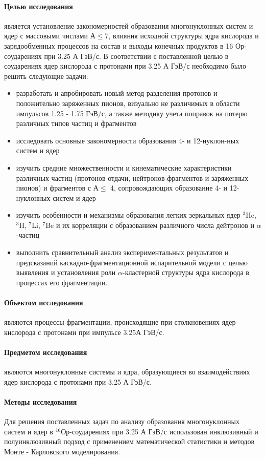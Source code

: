 \documentclass[fontsize=14pt]{scrarticle}
\begin{document}
\paragraph{Целью исследования}  является установление закономерностей образования многонуклонных систем и ядер с массовыми числами А$\le$7,
влияния исходной структуры ядра кислорода и зарядообменных процессов на состав и выходы конечных продуктов в 16 Ор-соударениях при 3.25 А ГэВ/с. В соответствии с поставленной целью в соударениях ядер кислорода с протонами при 3.25 А ГэВ/с необходимо было решить следующие задачи:
\begin{itemize}
    \item разработать и апробировать новый метод разделения протонов и положительно заряженных пионов, визуально не различимых в области импульсов 1.25 - 1.75 ГэВ/с, а также методику учета поправок на потерю различных типов частиц и фрагментов
    \item исследовать основные закономерности образования 4- и 12-нуклон-ных систем и ядер
    \item изучить средние множественности и кинематические характеристики различных частиц (протонов отдачи, нейтронов-фрагментов и заряженных пионов) и фрагментов с А$\le$ 4, сопровождающих образование 4- и 12- нуклонных систем и ядер
    \item изучить особенности и механизмы образования легких зеркальных ядер $^{3}$He, $^{3}$H, $^{7}$Li, $^{7}$Be и их корреляции с образованием различного числа дейтронов и $\alpha$-частиц
    \item выполнить сравнительный анализ экспериментальных результатов и предсказаний каскадно-фрагментационной испарительной модели с целью выявления и установления роли $\alpha$-кластерной структуры ядра кислорода в процессах его фрагментации.
\end{itemize}

\paragraph{Объектом исследования} являются процессы фрагментации, происходящие при столкновениях ядер кислорода с протонами при импульсе 3.25А ГэВ/с.
\paragraph{Предметом исследования}  являются многонуклонные системы и ядра, образующиеся во взаимодействиях ядер кислорода с протонами при 3.25 А ГэВ/с.
\paragraph{Методы исследования} Для решения поставленных задач по анализу образования многонуклонных систем и ядер в $^{16}$Ор-соударениях при 3.25 А ГэВ/с использован инклюзивный и полуинклюзивный подход с применением математической статистики и методов Монте - Карловского моделирования. 
\end{document}
